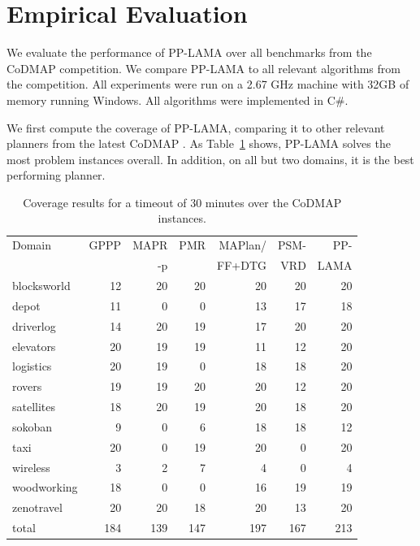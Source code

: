 \documentclass[letterpaper]{article}
\theoremstyle{definition}
\begin{document}
\section{Empirical Evaluation}

We evaluate the performance of PP-LAMA over all benchmarks from the CoDMAP competition. We compare PP-LAMA to all relevant algorithms from the competition. All experiments were run on a 2.67 GHz machine with 32GB of memory running Windows. All algorithms were implemented in C\#.

We first compute the coverage of PP-LAMA, comparing it to other relevant planners from the latest CoDMAP \citep{vstolba2015competition}. As Table~\ref{tbl:codmap} shows, PP-LAMA solves the most problem instances overall. In addition, on all but two domains, it is the best performing planner.



\begin{table}[t]
\scriptsize
\centering
\begin{tabular}{l|rrrrrr}

Domain			&GPPP	&MAPR	&PMR	&MAPlan/ &PSM-	&PP-		\\
	    		&		&-p	    &	    &FF+DTG	 &VRD	&LAMA 		\\\hline
blocksworld		&12		&20		&20		&20		&20		&20			\\
depot			&11		&0		&0		&13		&17		&18			\\
driverlog		&14		&20		&19		&17		&20		&20			\\
elevators		&20		&19		&19		&11		&12		&20			\\
logistics		&20		&19		&0		&18		&18		&20			\\
rovers			&19		&19		&20		&20		&12		&20			\\
satellites		&18		&20		&19		&20		&18		&20			\\
sokoban			&9		&0		&6		&18		&18		&12			\\
taxi			&20		&0		&19		&20		&0		&20			\\
wireless		&3		&2		&7		&4		&0		&4			\\
woodworking		&18		&0		&0		&16		&19		&19			\\
zenotravel		&20		&20		&18		&20		&13		&20			\\	\hline
total			&184	&139	&147	&197	&167	&213		\\

\end{tabular}
\caption{Coverage results for a timeout of 30 minutes over the CoDMAP instances.}
\label{tbl:codmap}
\end{table}
\end{document}
